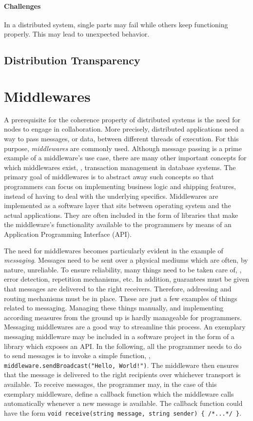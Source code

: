 \paragraph{Challenges} In a distributed system, single parts may fail while others keep functioning properly.  This may lead to unexpected behavior.

\subsection{Distribution Transparency}

\section{Middlewares}
A prerequisite for the coherence property of distributed systems is the need for nodes to engage in collaboration. More precisely, distributed applications need a way to pass messages, or data, between different threads of execution. For this purpose, \emph{middlewares} \cite{bernstein1996middleware} are commonly used. Although message passing is a prime example of a middleware's use case, there are many other important concepts for which middlewares exist, \eg , transaction management in database systems. The primary goal of middlewares is to abstract away such concepts so that programmers can focus on implementing business logic and shipping features, instead of having to deal with the underlying specifics. Middlewares are implemented as a software layer that sits between operating system and the actual applications. They are often included in the form of libraries that make the middleware's functionality available to the programmers by means of an Application Programming Interface (API). 

The need for middlewares becomes particularly evident in the example of \emph{messaging}. Messages need to be sent over a physical mediums which are often, by nature, unreliable. To ensure reliability, many things need to be taken care of, \eg , error detection, repetition mechanisms, etc. In addition, guarantees must be given that messages are delivered to the right receivers. Therefore, addressing and routing mechanisms must be in place. These are just a few examples of things related to messaging. Managing these things manually, and implementing according measures from the ground up is hardly manageable for programmers. Messaging middlewares are a good way to streamline this process. An exemplary messaging middleware may be included in a software project in the form of a library which exposes an API. In the following, all the programmer needs to do to send messages is to invoke a simple function, \eg , \texttt{middleware.sendBroadcast("Hello, World!")}. The middleware then ensures that the message is delivered to the right recipients over whichever transport is available. To receive messages, the programmer may, in the case of this exemplary middleware, define a callback function which the middleware calls automatically whenever a new message is available. The callback function could have the form \texttt{void receive(string message, string sender) \{ /*...*/ \}}.


